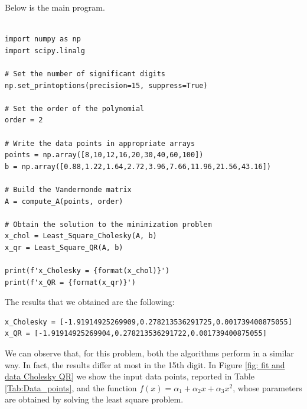 \documentclass[a4paper,11pt]{article}
\begin{document}
\noindent Below is the main program.
\begin{verbatim}

import numpy as np
import scipy.linalg

# Set the number of significant digits
np.set_printoptions(precision=15, suppress=True)

# Set the order of the polynomial
order = 2

# Write the data points in appropriate arrays
points = np.array([8,10,12,16,20,30,40,60,100])
b = np.array([0.88,1.22,1.64,2.72,3.96,7.66,11.96,21.56,43.16])

# Build the Vandermonde matrix
A = compute_A(points, order)

# Obtain the solution to the minimization problem
x_chol = Least_Square_Cholesky(A, b)
x_qr = Least_Square_QR(A, b)

print(f'x_Cholesky = {format(x_chol)}')
print(f'x_QR = {format(x_qr)}')	
\end{verbatim}

\noindent The results that we obtained are the following:

\begin{verbatim}
x_Cholesky = [-1.91914925269909,0.278213536291725,0.001739400875055]
x_QR = [-1.91914925269904,0.278213536291722,0.001739400875055]
\end{verbatim}

\noindent We can observe that, for this problem, both the algorithms perform in a similar way. In fact, the results differ at most in the 15th digit. In Figure \ref{fig: fit and data Cholesky QR} we show the input data points, reported in Table \ref{Tab:Data_points}, and the function $f(x) = \alpha_{1} + \alpha_{2}x + \alpha_{3}x^{2}$, whose parameters are obtained by solving the least square problem.
\end{document}
